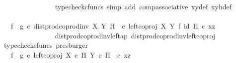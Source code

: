 \begin{isabellebody}
\ \ \ \ \ \ \ \ \ \ \ \ \ \ \isamarkupfalse%
\ {\isacharparenleft}{\kern0pt}typecheck{\isacharunderscore}{\kern0pt}cfuncs{\isacharcomma}{\kern0pt}\ simp\ add{\isacharcolon}{\kern0pt}\ comp{\isacharunderscore}{\kern0pt}associative{}\ xy{\isacharunderscore}{\kern0pt}def\ xyh{\isacharunderscore}{\kern0pt}def{\isacharparenright}{\kern0pt}\isanewline
\ \ \ \ \ \ \ \ \ \ \ \ \isamarkupfalse%
\ \isamarkupfalse%
\ {\isachardoublequoteopen}{\isachardot}{\kern0pt}{\isachardot}{\kern0pt}{\isachardot}{\kern0pt}\ {\isacharequal}{\kern0pt}\ {\isacharparenleft}{\kern0pt}f\isactrlsup {\isasymflat}\ {\isasymamalg}\ g\isactrlsup {\isasymflat}{\isacharparenright}{\kern0pt}\ {\isasymcirc}\isactrlsub c\ {\isacharparenleft}{\kern0pt}{\isacharparenleft}{\kern0pt}dist{\isacharunderscore}{\kern0pt}prod{\isacharunderscore}{\kern0pt}coprod{\isacharunderscore}{\kern0pt}inv{}\ X\ Y\ H\ \ {\isasymcirc}\isactrlsub c\ {\isacharparenleft}{\kern0pt}left{\isacharunderscore}{\kern0pt}coproj\ X\ Y\ {\isasymtimes}\isactrlsub f\ id\ H{\isacharparenright}{\kern0pt}{\isacharparenright}{\kern0pt}\ {\isasymcirc}\isactrlsub c\ {\isasymlangle}x{\isacharcomma}{\kern0pt}z{\isasymrangle}{\isacharparenright}{\kern0pt}{\isachardoublequoteclose}\isanewline
\ \ \ \ \ \ \ \ \ \ \ \ \ \ \isamarkupfalse%
\ dist{\isacharunderscore}{\kern0pt}prod{\isacharunderscore}{\kern0pt}coprod{\isacharunderscore}{\kern0pt}inv{}{\isacharunderscore}{\kern0pt}left{\isacharunderscore}{\kern0pt}ap\ dist{\isacharunderscore}{\kern0pt}prod{\isacharunderscore}{\kern0pt}coprod{\isacharunderscore}{\kern0pt}inv{}{\isacharunderscore}{\kern0pt}left{\isacharunderscore}{\kern0pt}coproj\ \isamarkupfalse%
\ {\isacharparenleft}{\kern0pt}typecheck{\isacharunderscore}{\kern0pt}cfuncs{\isacharcomma}{\kern0pt}\ presburger{\isacharparenright}{\kern0pt}\isanewline
\ \ \ \ \ \ \ \ \ \ \ \ \isamarkupfalse%
\ \isamarkupfalse%
\ {\isachardoublequoteopen}{\isachardot}{\kern0pt}{\isachardot}{\kern0pt}{\isachardot}{\kern0pt}\ {\isacharequal}{\kern0pt}\ {\isacharparenleft}{\kern0pt}f\isactrlsup {\isasymflat}\ {\isasymamalg}\ g\isactrlsup {\isasymflat}{\isacharparenright}{\kern0pt}\ {\isasymcirc}\isactrlsub c\ {\isacharparenleft}{\kern0pt}left{\isacharunderscore}{\kern0pt}coproj\ {\isacharparenleft}{\kern0pt}X\ {\isasymtimes}\isactrlsub c\ H{\isacharparenright}{\kern0pt}\ {\isacharparenleft}{\kern0pt}Y\ {\isasymtimes}\isactrlsub c\ H{\isacharparenright}{\kern0pt}\ \ {\isasymcirc}\isactrlsub c\ {\isasymlangle}x{\isacharcomma}{\kern0pt}z{\isasymrangle}{\isacharparenright}{\kern0pt}{\isachardoublequoteclose}\isanewline

\end{isabellebody}
